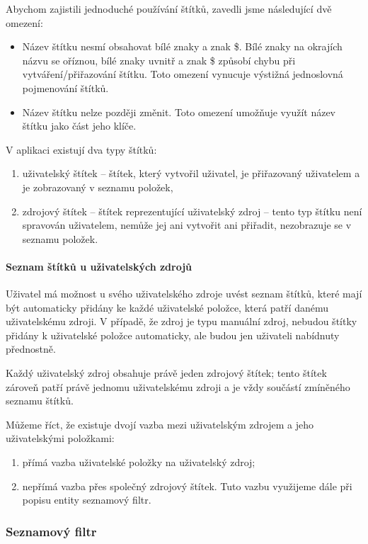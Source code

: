 Abychom zajistili jednoduché používání štítků, zavedli jsme následující dvě omezení:
\begin{itemize}
	\item Název štítku nesmí obsahovat bílé znaky a znak \$.
		Bílé znaky na okrajích názvu se oříznou, bílé znaky uvnitř a znak \$ způsobí chybu při vytváření/přiřazování štítku.
		Toto omezení vynucuje výstižná jednoslovná pojmenování štítků.
	\item Název štítku nelze později změnit.
		Toto omezení umožňuje využít název štítku jako část jeho klíče.
\end{itemize}

V aplikaci existují dva typy štítků:
\begin{enumerate}
	\item uživatelský štítek -- štítek, který vytvořil uživatel, je přiřazovaný uživatelem a je zobrazovaný v seznamu položek,
	\item zdrojový štítek -- štítek reprezentující uživatelský zdroj -- tento typ štítku není spravován uživatelem, nemůže jej ani vytvořit ani přiřadit, nezobrazuje se v seznamu položek.
\end{enumerate}

\paragraph{Seznam štítků u uživatelských zdrojů}
Uživatel má možnost u svého uživatelského zdroje uvést seznam štítků, které mají být automaticky přidány ke každé uživatelské položce, která patří danému uživatelskému zdroji.
V případě, že zdroj je typu manuální zdroj, nebudou štítky přidány k uživatelské položce automaticky, ale budou jen uživateli nabídnuty přednostně.

Každý uživatelský zdroj obsahuje právě jeden zdrojový štítek; tento štítek zároveň patří právě jednomu uživatelskému zdroji a je vždy součástí zmíněného seznamu štítků.

Můžeme říct, že existuje dvojí vazba mezi uživatelským zdrojem a jeho uživatelskými položkami:
\begin{enumerate}
	\item přímá vazba uživatelské položky na uživatelský zdroj;
	\item nepřímá vazba přes společný zdrojový štítek.
		Tuto vazbu využijeme dále při popisu entity seznamový filtr.
\end{enumerate}

\subsubsection{Seznamový filtr}

